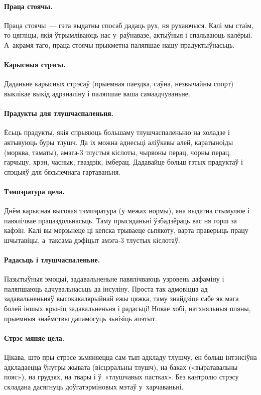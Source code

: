 \paragraph{Праца стоячы.}
Праца стоячы~--- гэта выдатны спосаб дадаць рух, ня рухаючыся. Калі мы стаім, то цягліцы, якія ўтрымліваюць нас у~раўнавазе, актыўныя і спальваюць калёрыі. А~акрамя таго, праца стоячы прыкметна паляпшае нашу прадуктыўнасьць.

\paragraph{Карысныя стрэсы.}
Даданьне карысных стрэсаў (прыемная паездка, саўна, незвычайны спорт) выклікае выкід адрэналіну і паляпшае ваша самаадчуваньне.

\paragraph{Прадукты для тлушчаспаленьня.}
Ёсьць прадукты, якія спрыяюць большаму тлушчаспаленьню на холадзе і актывуюць буры тлушч. Да іх можна аднесьці аліўкавы алей, каратыноіды (морква, таматы), амэга-3 тлустыя кіслоты, чырвоны перац, чорны перац, гарчыцу, хрэн, часнык, гваздзік, імберац. Дадавайце больш гэтых прадуктаў і спэцыяў для бясьпечнага гартаваньня.

\paragraph{Тэмпэратура цела.}
Днём карысная высокая тэмпэратура (у межах нормы), яна выдатна стымулюе і павялічвае працаздольнасьць. Таму прысяданьні ўзбадзёраць вас ня горш за кафэін. Калі вы мерзьнеце ці кепска трываеце сьпякоту, варта праверыць працу шчытавіцы, а~таксама дэфіцыт амэга-3 тлустых кіслотаў.

\paragraph{Радасьць і тлушчаспаленьне.}
Пазытыўныя эмоцыі, задавальненьне павялічваюць узровень дафаміну і паляпшаюць адчувальнасьць да інсуліну. Проста так адмовіцца ад задавальненьняў высокакалярыйнай ежы цяжка, таму знайдзіце сабе як мага болей іншых крыніц задавальненьня і радасьці! Новае хобі, натхняльныя пляны, прыемныя знаёмствы дапамогуць зьнізіць апэтыт.

\paragraph{Стрэс мяняе цела.}
Цікава, што пры стрэсе зьмяняецца сам тып адкладу тлушчу, ён больш інтэнсіўна адкладаецца ўнутры жывата (вісцэральны тлушч), на баках («выратавальны пояс»), на грудзях, на твары і ў~«тлушчавых пастках». Без кантролю стрэсу складана дасягнуць доўгатэрміновых мэтаў у~харчаваньні.

